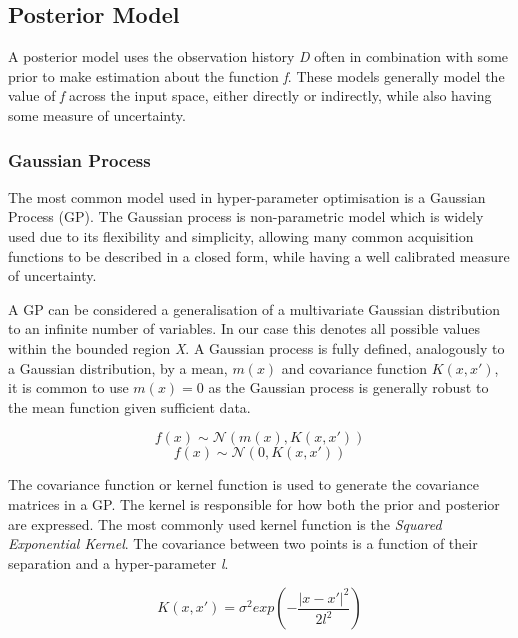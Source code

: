 \documentclass{article}
\begin{document}
	\subsection{Posterior Model}

		A posterior model uses the observation history \textit{D} often in combination with some prior to make estimation about the function \textit{f}. These models generally model the value of \textit{f} across the input space, either directly or indirectly, while also having some measure of uncertainty.




		\subsubsection{Gaussian Process}

			The most common model used in hyper-parameter optimisation is a Gaussian Process (GP)\cite{17}. The Gaussian process is non-parametric model which is widely used due to its flexibility and simplicity, allowing many common acquisition functions to be described in a closed form, while having a well calibrated measure of uncertainty.
			\par
			A GP can be considered a generalisation of a multivariate Gaussian distribution to an infinite number of variables. In our case this denotes all possible values within the bounded region \textit{X}. A Gaussian process is fully defined, analogously to a Gaussian distribution, by a mean, \(m(x)\) and covariance function \(K(x,x')\), it is common to use \(m(x) = 0\) as the Gaussian process is generally robust to the mean function given sufficient data.

			\begin{equation}f(x) \sim  \mathcal{N}(m(x) , K(x,x'))\end{equation}
			\begin{equation}f(x) \sim  \mathcal{N}(0 , K(x,x'))\end{equation}

			The covariance function or kernel function is used to generate the covariance matrices in a GP. The kernel is responsible for how both the prior and posterior are expressed. The most commonly used kernel function is the \textit{Squared Exponential Kernel}. The covariance between two points is a function of their separation and a hyper-parameter \textit{l}. 

			\begin{equation}K(x,x') = \sigma^2 exp\left(-\frac{\mathopen|x - x'\mathclose|^2}{2l^2}\right)\end{equation}
\end{document}
